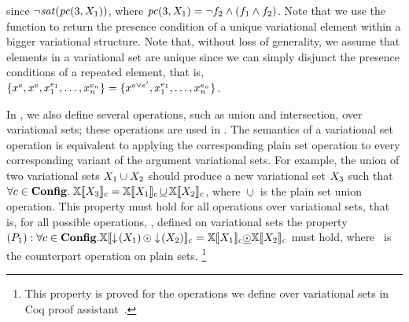 since 
\ensuremath{\neg \sat {\getPCfrom 3 {\vset_1} }},
where
\ensuremath{
{\getPCfrom 3 {\vset_1} } = \neg \B \wedge (\A \wedge \B)}.
Note that we use the function \getPCfrom \elem {\annot \vset} to 
return the presence condition of a unique variational element within a bigger
variational structure. 
Note that,
without loss of generality, we assume that elements in a variational set
are unique since we can simply disjunct the presence conditions of a repeated 
element, that is, 
\ensuremath{\setDef {\annot [\dimMeta] \elem, \annot [\dimMeta] \elem, \annot [\dimMeta_1] \elem_1, \ldots, \annot [\dimMeta_n] \elem_n} = \setDef {\annot [\dimMeta \vee \VVal \dimMeta] \elem, \annot [\dimMeta_1] \elem_1, \ldots, \annot [\dimMeta_n] \elem_n}}.

In , we also define several operations, such as union and
intersection, over variational sets; these operations are used in . The
semantics of a variational set operation is equivalent to applying the corresponding
plain set operation to every corresponding variant of the argument variational sets. For
example, the union of two variational sets $\vset_1\cup\vset_2$ should produce a new
variational set $\vset_3$ such that
%
$\forall c\in\confSet.\;
\osetSem{\vset_3} = \osetSem{\vset_1}\,\underline{\cup}\,\osetSem{\vset_2}$,
where $\underline{\cup}$ is the plain set union operation.
%
 This property must hold for all operations over variational sets, that is, for all possible operations, \vsetOp, defined on variational sets the property 
 \ensuremath{
 \Pone: 
 \forall \config \in \confSet. \osetSem {\pushIn {\vset_1} \vsetOp \pushIn {\vset_2}} 
 = \osetSem {\vset_1} \psetOp \osetSem {\vset_2}
 } must hold, where \psetOp\ is the counterpart operation on plain sets.%
\footnote{This property is proved for the operations we define over variational sets in Coq proof assistant~\cite{Khan21}.}

